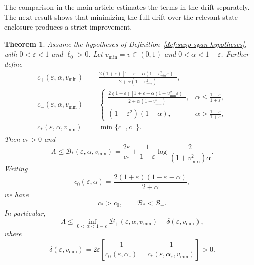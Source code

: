 \documentclass[11pt,a4paper]{article}
\numberwithin{equation}{section}
\theoremstyle{plain}
\newtheorem{theorem}{Theorem}
\theoremstyle{definition}
\theoremstyle{remark}
\newcommand{\ellzero}{\ell_0}
\begin{document}
The comparison in the main article estimates the terms in the drift separately. The next result shows that minimizing the full drift over the relevant state enclosure produces a strict improvement.
\begin{theorem}\label{thm:refined-positive-l-span}
Assume the hypotheses of Definition~\ref{def:supp-span-hypotheses}, with $0<\varepsilon<1$ and $\ellzero>0$. Let $v_{\min}=\underline v\in(0,1)$ and $0<\alpha<1-\varepsilon$. Further define
\begin{align}
c_+(\varepsilon,\alpha,v_{\min})&=\frac{2(1+\varepsilon)
[1-\varepsilon-\alpha(1-v_{\min}^2\varepsilon)]}
{2+\alpha(1-v_{\min}^2)},\label{eq:c-plus-refined}\\
c_-(\varepsilon,\alpha,v_{\min})&=\begin{cases}
\displaystyle
\frac{2(1-\varepsilon)
[1+\varepsilon-\alpha(1+v_{\min}^2\varepsilon)]}
{2+\alpha(1-v_{\min}^2)},
&\displaystyle\alpha\leqslant\frac{1-\varepsilon}{1+\varepsilon},\\[3mm]
(1-\varepsilon^2)(1-\alpha),
&\displaystyle\alpha>\frac{1-\varepsilon}{1+\varepsilon},
\end{cases}
\label{eq:c-minus-refined}\\
c_*(\varepsilon,\alpha,v_{\min})&=\min\{c_+,c_-\}.
\label{eq:c-star-refined}
\end{align}
Then $c_*>0$ and
\begin{equation}\label{eq:refined-positive-l-bound}
\Lambda\leqslant\mathcal B_*(\varepsilon,\alpha,v_{\min})
=\frac{2\varepsilon}{c_*}+\frac{1}{1-\varepsilon}
\log\frac{2}{(1+v_{\min}^2)\alpha}.
\end{equation}
Writing
\begin{equation}\label{eq:c-zero-old-comparison}
c_0(\varepsilon,\alpha)=\frac{2(1+\varepsilon)(1-\varepsilon-\alpha)}{2+\alpha},
\end{equation}
we have
\begin{equation}\label{eq:strict-positive-l-gap}
c_*>c_0,\qquad\mathcal B_*<\mathcal B_+.
\end{equation}
In particular,
\begin{equation}\label{eq:strict-gap-from-old-optimum}
\Lambda\leqslant
\inf_{0<\alpha<1-\varepsilon}
\mathcal B_+(\varepsilon,\alpha,v_{\min})-\delta(\varepsilon,v_{\min}),
\end{equation}
where
\begin{equation}
\delta(\varepsilon,v_{\min})
=2\varepsilon\left[\frac{1}{c_0(\varepsilon,\alpha_\varepsilon)}
-\frac{1}{c_*(\varepsilon,\alpha_\varepsilon,v_{\min})}\right]>0.
\end{equation}
\end{theorem}
\end{document}
